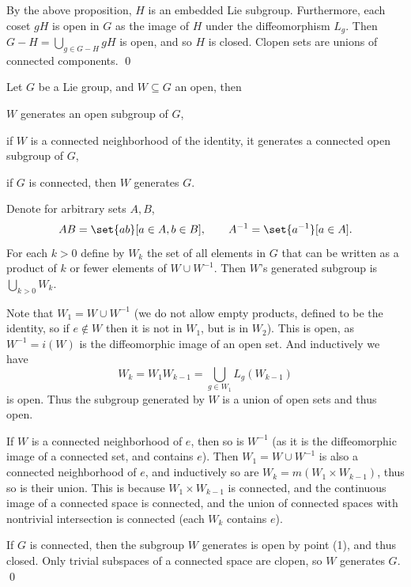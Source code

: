\elemm

\bproof

    By the above proposition, $H$ is an embedded Lie subgroup.
    Furthermore, each coset $gH$ is open in $G$ as the image of $H$ under the diffeomorphism $L_g$.
    Then $G-H=\bigcup_{g\in G-H}gH$ is open, and so $H$ is closed.
    Clopen sets are unions of connected components.
    \qed

\eproof

\bprop

    Let $G$ be a Lie group, and $W\subseteq G$ an open, then
    \benum
        \item $W$ generates an open subgroup of $G$,
        \item if $W$ is a connected neighborhood of the identity, it generates a connected open subgroup of $G$,
        \item if $G$ is connected, then $W$ generates $G$.
    \eenum

\eprop

\bproof

    Denote for arbitrary sets $A,B$,
    $$ AB = \set{ab}[a\in A,b\in B],\qquad A^{-1} = \set{a^{-1}}[a\in A] . $$
    For each $k>0$ define by $W_k$ the set of all elements in $G$ that can be written as a product of $k$ or fewer elements of $W\cup W^{-1}$.
    Then $W$'s generated subgroup is $\bigcup_{k>0}W_k$.

    Note that $W_1=W\cup W^{-1}$ (we do not allow empty products, defined to be the identity, so if $e\notin W$ then it is not in $W_1$, but is
    in $W_2$).
    This is open, as $W^{-1}=i(W)$ is the diffeomorphic image of an open set.
    And inductively we have
    $$ W_k = W_1W_{k-1} = \bigcup_{g\in W_1}L_g(W_{k-1}) $$
    is open.
    Thus the subgroup generated by $W$ is a union of open sets and thus open.

    If $W$ is a connected neighborhood of $e$, then so is $W^{-1}$ (as it is the diffeomorphic image of a connected set, and contains $e$).
    Then $W_1=W\cup W^{-1}$ is also a connected neighborhood of $e$, and inductively so are $W_k=m(W_1\times W_{k-1})$, thus so is their union.
    This is because $W_1\times W_{k-1}$ is connected, and the continuous image of a connected space is connected, and the union of connected
    spaces with nontrivial intersection is connected (each $W_k$ contains $e$).

    If $G$ is connected, then the subgroup $W$ generates is open by point (1), and thus closed.
    Only trivial subspaces of a connected space are clopen, so $W$ generates $G$.
    \qed

